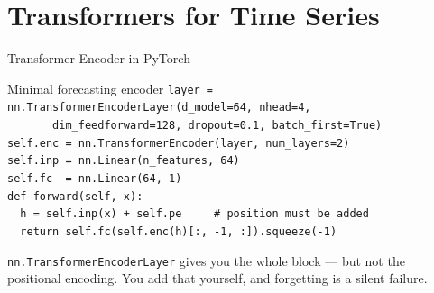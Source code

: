 \documentclass[aspectratio=169, 11pt]{beamer}
\begin{document}
\section{Transformers for Time Series}


\begin{frame}{Transformer Encoder in PyTorch}
  \begin{examplebox}{Minimal forecasting encoder}
    {\tiny\linespread{1.15}\selectfont
    \texttt{layer = nn.TransformerEncoderLayer(d\_model=64, nhead=4,}\\
    \texttt{\ \ \ \ \ \ \ dim\_feedforward=128, dropout=0.1, batch\_first=True)}\\
    \texttt{self.enc = nn.TransformerEncoder(layer, num\_layers=2)}\\
    \texttt{self.inp = nn.Linear(n\_features, 64)}\\
    \texttt{self.fc\ \ = nn.Linear(64, 1)}\\[3pt]
    \texttt{def forward(self, x):}\\
    \texttt{\ \ h = self.inp(x) + self.pe\ \ \ \ \ \# position must be added}\\
    \texttt{\ \ return self.fc(self.enc(h)[:, -1, :]).squeeze(-1)}
    }
  \end{examplebox}
  \texttt{nn.TransformerEncoderLayer} gives you the whole block --- but not the positional
  encoding. You add that yourself, and forgetting is a silent failure.

\end{frame}
\end{document}
